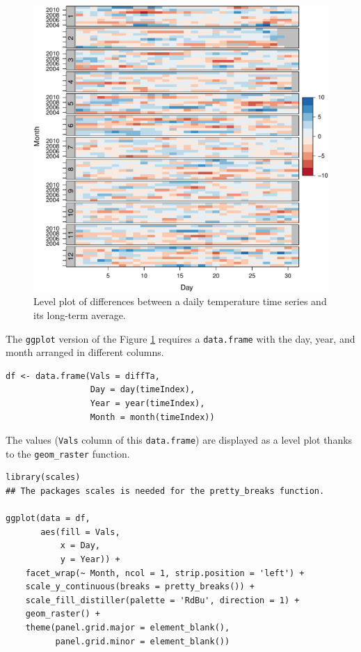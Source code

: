 \documentclass[smallroyalvopaper]{memoir}
\begin{document}
\begin{figure}[htbp]
\centering
\includegraphics[width=.9\linewidth]{figs/diffTa_levelplot.pdf}
\caption{Level plot of differences between a daily temperature time series and its long-term average. \label{fig:diffTa_level}}
\end{figure}

The \texttt{ggplot} version of the Figure  \ref{fig:diffTa_level} requires a \texttt{data.frame} with the day, year, and month arranged in different columns.
\lstset{language=r,label= ,caption= ,captionpos=b,numbers=none}
\begin{lstlisting}
df <- data.frame(Vals = diffTa,
                 Day = day(timeIndex),
                 Year = year(timeIndex),
                 Month = month(timeIndex))
\end{lstlisting}

The values (\texttt{Vals} column of this \texttt{data.frame}) are displayed as a level plot thanks to the \texttt{geom\_raster} function.
\lstset{language=r,label= ,caption= ,captionpos=b,numbers=none}
\begin{lstlisting}
library(scales) 
## The packages scales is needed for the pretty_breaks function.

ggplot(data = df,
       aes(fill = Vals,
           x = Day,
           y = Year)) +
    facet_wrap(~ Month, ncol = 1, strip.position = 'left') +
    scale_y_continuous(breaks = pretty_breaks()) + 
    scale_fill_distiller(palette = 'RdBu', direction = 1) + 
    geom_raster() +
    theme(panel.grid.major = element_blank(),
          panel.grid.minor = element_blank())
\end{lstlisting}
\end{document}
